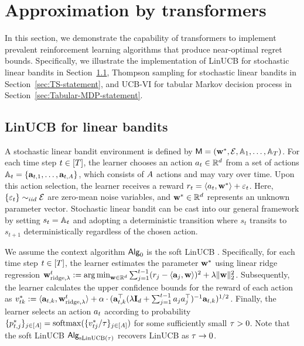 \section{Approximation by transformers}\label{sec:ICRL}

In this section, we demonstrate the capability of transformers to implement prevalent reinforcement learning algorithms that produce near-optimal regret bounds. Specifically, we illustrate the implementation of LinUCB for stochastic linear bandits in Section~\ref{sec:LinUCB-statement}, Thompson sampling for stochastic linear bandits in Section~\ref{sec:TS-statement}, and UCB-VI for tabular Markov decision process in Section~\ref{sec:Tabular-MDP-statement}. %

\subsection{LinUCB for linear bandits}\label{sec:LinUCB-statement}

A stochastic linear bandit environment is defined by ${\mathsf{M}}=({{\mathbf w}^*},{\mathcal{E}},{{\mathbb{A}}}_1,\ldots,{{\mathbb{A}}}_{T})$. For each time step $t\in[{T}]$, the learner chooses an action ${a}_t\in\mathbb{R}^{d}$ from a set of actions ${\mathbb{A}}_t=\{{\mathbf a}_{t,1},\ldots,{\mathbf a}_{t,{A}}\}$, which consists of ${A}$ actions and may vary over time. Upon this action selection, the learner receives a reward ${r}_t=\left\langle{a}_t,{{\mathbf w}^*}\right\rangle+{\varepsilon}_t$. Here,$\{ {\varepsilon}_t \} \sim_{ iid} {\mathcal{E}}$ are zero-mean noise variables, and ${{\mathbf w}^*}\in\mathbb{R}^{d}$ represents an unknown parameter vector. Stochastic linear bandit can be cast into our general framework by setting $s_t = {{\mathbb{A}}}_t$ and adopting a deterministic transition where $s_t$ transits to $s_{t+1}$ deterministically regardless of the chosen action.




We assume the context algorithm ${\mathsf{Alg}}_0$ is the soft LinUCB \citep{chu2011contextual}. Specifically, for each time step $t\in[{T}]$, the learner estimates the parameter ${{\mathbf w}^*}$ using linear ridge regression ${\mathbf w}^t_{{\rm ridge},\lambda}:=\operatorname*{arg\,min}_{{\mathbf w}\in\mathbb{R}^d} \sum_{j=1}^{t-1}({r}_j-\left\langle{\mathbf a}_j,{\mathbf w}\right\rangle)^2+ \lambda \|{\mathbf w}\|_2^2$. Subsequently, the learner calculates the upper confidence bounds for the reward of each action as $v^*_{tk}:=\langle {\mathbf a}_{t,k},{\mathbf w}^t_{{\rm ridge},\lambda}\rangle +{\alpha} \cdot ({\mathbf a}_{t,k}^\top (\lambda{\mathbf I}_d+\sum_{j=1}^{t-1}{a}_j{a}_j^\top)^{-1}  {\mathbf a}_{t,k})^{1/2}$. Finally, the learner selects an action ${a}_t$ according to probability $\{ p^*_{t,j} \}_{j \in [{A}]} = {\rm softmax}(\{v^*_{tj}/{\tau} \}_{j \in [{A}]})$ for some sufficiently small ${\tau}>0$. Note that the soft LinUCB ${\mathsf{Alg}}_{{\mathrm{sLinUCB}}({\tau})}$ recovers LinUCB as ${\tau}\to 0$.


